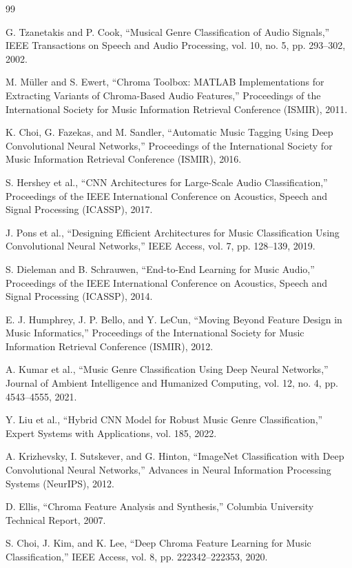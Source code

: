 \documentclass[12pt,a4paper]{report}
\begin{document}
\begin{thebibliography}{99}

G. Tzanetakis and P. Cook, ``Musical Genre Classification of Audio Signals,'' IEEE Transactions on Speech and Audio Processing, vol. 10, no. 5, pp. 293--302, 2002.

M. Müller and S. Ewert, ``Chroma Toolbox: MATLAB Implementations for Extracting Variants of Chroma-Based Audio Features,'' Proceedings of the International Society for Music Information Retrieval Conference (ISMIR), 2011.

K. Choi, G. Fazekas, and M. Sandler, ``Automatic Music Tagging Using Deep Convolutional Neural Networks,'' Proceedings of the International Society for Music Information Retrieval Conference (ISMIR), 2016.

S. Hershey et al., ``CNN Architectures for Large-Scale Audio Classification,'' Proceedings of the IEEE International Conference on Acoustics, Speech and Signal Processing (ICASSP), 2017.

J. Pons et al., ``Designing Efficient Architectures for Music Classification Using Convolutional Neural Networks,'' IEEE Access, vol. 7, pp. 128--139, 2019.

S. Dieleman and B. Schrauwen, ``End-to-End Learning for Music Audio,'' Proceedings of the IEEE International Conference on Acoustics, Speech and Signal Processing (ICASSP), 2014.

E. J. Humphrey, J. P. Bello, and Y. LeCun, ``Moving Beyond Feature Design in Music Informatics,'' Proceedings of the International Society for Music Information Retrieval Conference (ISMIR), 2012.

A. Kumar et al., ``Music Genre Classification Using Deep Neural Networks,'' Journal of Ambient Intelligence and Humanized Computing, vol. 12, no. 4, pp. 4543--4555, 2021.

Y. Liu et al., ``Hybrid CNN Model for Robust Music Genre Classification,'' Expert Systems with Applications, vol. 185, 2022.

A. Krizhevsky, I. Sutskever, and G. Hinton, ``ImageNet Classification with Deep Convolutional Neural Networks,'' Advances in Neural Information Processing Systems (NeurIPS), 2012.

D. Ellis, ``Chroma Feature Analysis and Synthesis,'' Columbia University Technical Report, 2007.

S. Choi, J. Kim, and K. Lee, ``Deep Chroma Feature Learning for Music Classification,'' IEEE Access, vol. 8, pp. 222342--222353, 2020.


\end{thebibliography}
\end{document}
